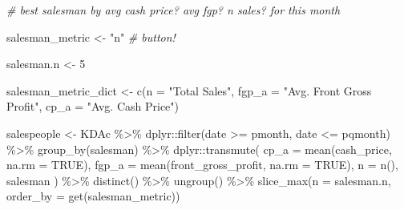 \documentclass[
]{article}
\newenvironment{Shaded}{\begin{snugshade}}{\end{snugshade}}
\newcommand{\AttributeTok}[1]{\textcolor[rgb]{0.77,0.63,0.00}{#1}}
\newcommand{\CommentTok}[1]{\textcolor[rgb]{0.56,0.35,0.01}{\textit{#1}}}
\newcommand{\ConstantTok}[1]{\textcolor[rgb]{0.00,0.00,0.00}{#1}}
\newcommand{\DecValTok}[1]{\textcolor[rgb]{0.00,0.00,0.81}{#1}}
\newcommand{\FunctionTok}[1]{\textcolor[rgb]{0.00,0.00,0.00}{#1}}
\newcommand{\NormalTok}[1]{#1}
\newcommand{\OtherTok}[1]{\textcolor[rgb]{0.56,0.35,0.01}{#1}}
\newcommand{\SpecialCharTok}[1]{\textcolor[rgb]{0.00,0.00,0.00}{#1}}
\newcommand{\StringTok}[1]{\textcolor[rgb]{0.31,0.60,0.02}{#1}}
\begin{document}
\begin{Shaded}
\begin{Highlighting}[]
\CommentTok{\# best salesman by avg cash price? avg fgp? n sales? for this month}

\NormalTok{salesman\_metric }\OtherTok{\textless{}{-}} \StringTok{"n"} \CommentTok{\# button!}

\NormalTok{salesman.n }\OtherTok{\textless{}{-}} \DecValTok{5}

\NormalTok{salesman\_metric\_dict }\OtherTok{\textless{}{-}}
  \FunctionTok{c}\NormalTok{(}\AttributeTok{n =} \StringTok{"Total Sales"}\NormalTok{, }\AttributeTok{fgp\_a =} \StringTok{"Avg. Front Gross Profit"}\NormalTok{, }\AttributeTok{cp\_a =} \StringTok{"Avg. Cash Price"}\NormalTok{)}

\NormalTok{salespeople }\OtherTok{\textless{}{-}}\NormalTok{ KDAc }\SpecialCharTok{\%\textgreater{}\%}
\NormalTok{  dplyr}\SpecialCharTok{::}\FunctionTok{filter}\NormalTok{(date }\SpecialCharTok{\textgreater{}=}\NormalTok{ pmonth, date }\SpecialCharTok{\textless{}=}\NormalTok{ pqmonth) }\SpecialCharTok{\%\textgreater{}\%}
  \FunctionTok{group\_by}\NormalTok{(salesman) }\SpecialCharTok{\%\textgreater{}\%}
\NormalTok{  dplyr}\SpecialCharTok{::}\FunctionTok{transmute}\NormalTok{(}
    \AttributeTok{cp\_a =} \FunctionTok{mean}\NormalTok{(cash\_price, }\AttributeTok{na.rm =} \ConstantTok{TRUE}\NormalTok{),}
    \AttributeTok{fgp\_a =} \FunctionTok{mean}\NormalTok{(front\_gross\_profit, }\AttributeTok{na.rm =} \ConstantTok{TRUE}\NormalTok{),}
    \AttributeTok{n =} \FunctionTok{n}\NormalTok{(),}
\NormalTok{    salesman}
\NormalTok{  ) }\SpecialCharTok{\%\textgreater{}\%}
  \FunctionTok{distinct}\NormalTok{() }\SpecialCharTok{\%\textgreater{}\%}
  \FunctionTok{ungroup}\NormalTok{() }\SpecialCharTok{\%\textgreater{}\%}
  \FunctionTok{slice\_max}\NormalTok{(}\AttributeTok{n =}\NormalTok{ salesman.n, }\AttributeTok{order\_by =} \FunctionTok{get}\NormalTok{(salesman\_metric))}


\end{Highlighting}
\end{Shaded}
\end{document}
